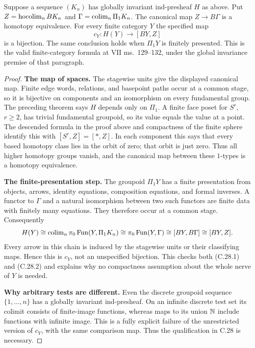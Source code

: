 \begin{proposition}
\label{F:C28}
Suppose a sequence $(K_n)$ has globally invariant ind-presheaf $H$ as
above. Put $Z=\operatorname{hocolim}_n BK_n$ and
$\Gamma=\operatorname{colim}_n\Pi_1K_n$. The canonical map $Z\to B\Gamma$ is a
homotopy equivalence. For every finite category $Y$ the specified map
\[
 c_Y:H(Y)\longrightarrow[BY,Z]
\]
is a bijection. The same conclusion holds when $\Pi_1Y$ is finitely
presented. This is the valid finite-category formula at VII
ms.~129--132, under the global invariance premise of that paragraph.
\end{proposition}
\begin{proof}
\textbf{The map of spaces.} The stagewise units give the displayed
canonical map. Finite edge words, relations, and basepoint paths occur
at a common stage, so it is bijective on components and an isomorphism
on every fundamental group. The preceding theorem says $H$ depends
only on $\Pi_1$. A finite face poset for $S^r$, $r\geq2$, has trivial
fundamental groupoid, so its value equals the value at a point.
The descended formula in the proof above and compactness of the finite
sphere identify this with $[S^r,Z]=[*,Z]$. In each component this says
that every based homotopy class lies in the orbit of zero; that orbit is
just zero. Thus all higher homotopy groups vanish, and the canonical map
between these $1$-types is a homotopy equivalence.

\textbf{The finite-presentation step.} The groupoid $\Pi_1Y$ has a finite
presentation from objects, arrows, identity equations, composition
equations, and formal inverses. A functor to $\Gamma$ and a natural
isomorphism between two such functors are finite data with finitely many
equations. They therefore occur at a common stage. Consequently
\[
 H(Y)\cong\operatorname{colim}_n\pi_0\operatorname{Fun}(Y,\Pi_1K_n)
 \cong\pi_0\operatorname{Fun}(Y,\Gamma)
 \cong[BY,B\Gamma]\cong[BY,Z].
\]
Every arrow in this chain is induced by the stagewise units or their
classifying maps. Hence this is $c_Y$, not an unspecified bijection.
This checks both (C.28.1) and (C.28.2) and explains why no compactness
assumption about the whole nerve of $Y$ is needed.

\textbf{Why arbitrary tests are different.} Even the discrete groupoid
sequence $\{1,\ldots,n\}$ has a globally invariant ind-presheaf.
On an infinite discrete test set its colimit consists of finite-image
functions, whereas maps to its union $\mathbb N$ include functions with infinite
image. This is a fully explicit failure of the unrestricted version of
$c_Y$, with the same comparison map. Thus the qualification in C.28 is
necessary.
\end{proof}

